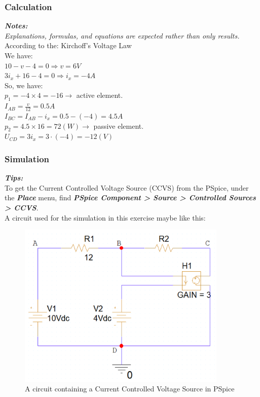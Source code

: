 \subsubsection{Calculation}
\textit{\textbf{Notes:}}\\
\textit{Explanations, formulas, and equations are expected rather than only results.}\\

According to the: Kirchoff's Voltage Law \dotfill\bigskip\\
We have:\bigskip\\
$10 - v  - 4 = 0 \Rightarrow v = 6V$\dotfill\bigskip\\
$3i_x + 16 - 4  = 0 \Rightarrow i_x = -4 A$\dotfill\bigskip\\
So, we have:\bigskip\\
$p_1 = -4 \times 4 = -16$\dotfill $\longrightarrow$ active element.\bigskip\\
$I_{AB} = \frac{v}{12} = 0.5A$ \dotfill\bigskip\\
$I_{BC} = I_{AB} - i_x = 0.5 - (-4) = 4.5A$ \dotfill\bigskip\\
$p_2 = 4.5 \times 16 = 72(W)$\dotfill $\longrightarrow$  passive element.\bigskip\\
$U_{CD} = 3i_x = 3 \cdot (-4) = -12(V)$\dotfill\bigskip\

\subsubsection{Simulation}

\textbf{\textit{Tips:}}\\
To get the Current Controlled Voltage Source (CCVS) from the PSpice, under the \textit{\textbf{Place}} menu, find \textbf{\textit{PSpice Component > Source > Controlled Sources > CCVS}}.\\

A circuit used for the simulation in this exercise maybe like this:
\begin{figure}[H]
    \centering
    \includegraphics[width = 10cm]{source/picture/bai_1/lab1_ex9_ps.png}
    \caption{A circuit containing a Current Controlled Voltage Source in PSpice}
    \label{lab1_ex9_ps}
\end{figure}

